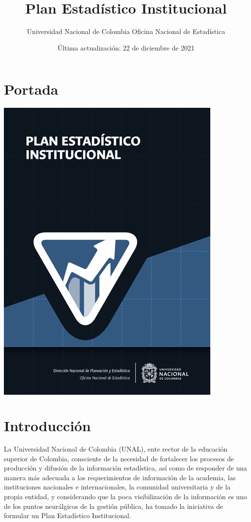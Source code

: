 \documentclass[
]{book}
\title{Plan Estadístico Institucional}
\author{ Universidad Nacional de Colombia Oficina Nacional de Estadística}
\date{Última actualización: 22 de diciembre de 2021}
\begin{document}
\maketitle

{
\setcounter{tocdepth}{1}
\tableofcontents
}
\hypertarget{portada}{%
\chapter*{Portada}\label{portada}}

\begin{center}\includegraphics[width=0.75\linewidth]{Imagenes/Portada} \end{center}

\hypertarget{intro}{%
\chapter{Introducción}\label{intro}}

La Universidad Nacional de Colombia (UNAL), ente rector de la educación superior de Colombia, consciente de la necesidad de fortalecer los procesos de producción y difusión de la información estadística, así como de responder de una manera más adecuada a los requerimientos de información de la academia, las instituciones nacionales e internacionales, la comunidad universitaria y de la propia entidad, y considerando que la poca visibilización de la información es uno de los puntos neurálgicos de la gestión pública, ha tomado la iniciativa de formular un Plan Estadístico Institucional.
\end{document}

